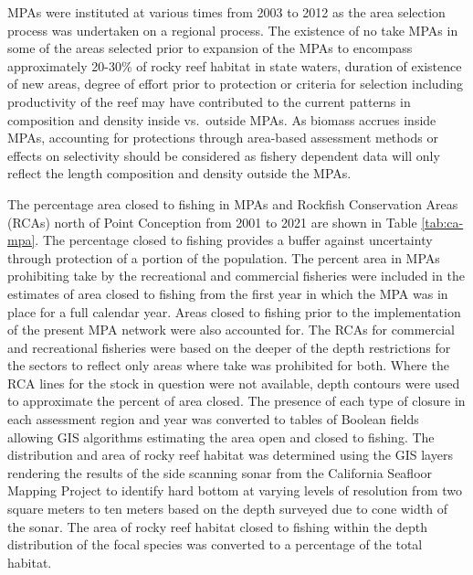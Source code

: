 \documentclass[11pt,
  english,
  a4paper,
]{article}
\begin{document}
MPAs were instituted at various times from 2003 to 2012 as the area selection process was undertaken on a regional process. The existence of no take MPAs in some of the areas selected prior to expansion of the MPAs to encompass approximately 20-30\% of rocky reef habitat in state waters, duration of existence of new areas, degree of effort prior to protection or criteria for selection including productivity of the reef may have contributed to the current patterns in composition and density inside vs.~outside MPAs. As biomass accrues inside MPAs, accounting for protections through area-based assessment methods or effects on selectivity should be considered as fishery dependent data will only reflect the length composition and density outside the MPAs.

\leavevmode\tagmcend\tagstructend\par


The percentage area closed to fishing in MPAs and Rockfish Conservation Areas (RCAs) north of Point Conception from 2001 to 2021 are shown in Table \ref{tab:ca-mpa}. The percentage closed to fishing provides a buffer against uncertainty through protection of a portion of the population. The percent area in MPAs prohibiting take by the recreational and commercial fisheries were included in the estimates of area closed to fishing from the first year in which the MPA was in place for a full calendar year. Areas closed to fishing prior to the implementation of the present MPA network were also accounted for. The RCAs for commercial and recreational fisheries were based on the deeper of the depth restrictions for the sectors to reflect only areas where take was prohibited for both. Where the RCA lines for the stock in question were not available, depth contours were used to approximate the percent of area closed. The presence of each type of closure in each assessment region and year was converted to tables of Boolean fields allowing GIS algorithms estimating the area open and closed to fishing. The distribution and area of rocky reef habitat was determined using the GIS layers rendering the results of the side scanning sonar from the California Seafloor Mapping Project to identify hard bottom at varying levels of resolution from two square meters to ten meters based on the depth surveyed due to cone width of the sonar. The area of rocky reef habitat closed to fishing within the depth distribution of the focal species was converted to a percentage of the total habitat.
\end{document}
